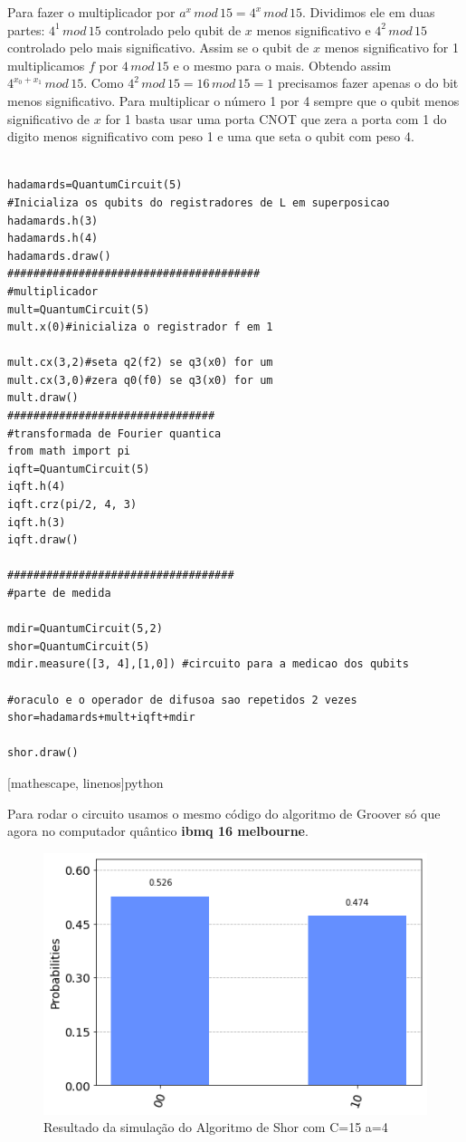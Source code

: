 \documentclass[12pt,a4paper]{article}
\begin{document}
Para fazer o multiplicador por $a^x\, mod\, 15=4^x\, mod\, 15$. Dividimos ele em duas partes: $4^1\, mod\, 15$ controlado pelo qubit de $x$ menos significativo e $4^2\, mod\, 15$ controlado pelo mais significativo. Assim se o qubit de $x$ menos significativo for 1 multiplicamos $f$ por $4\,mod\,15$ e o mesmo para o mais. Obtendo assim $4^{x_0+x_1}\, mod\, 15$. Como $4^2\,mod\,15=16\,mod\,15=1$ precisamos fazer apenas o do bit menos significativo. Para multiplicar o número 1 por 4 sempre que o qubit menos significativo de $x$ for 1 basta usar uma porta CNOT que zera a porta com 1 do digito menos significativo com peso 1 e uma que seta o qubit com peso 4.

\begin{verbatim}

hadamards=QuantumCircuit(5)
#Inicializa os qubits do registradores de L em superposicao
hadamards.h(3)
hadamards.h(4)
hadamards.draw()
#######################################
#multiplicador
mult=QuantumCircuit(5)
mult.x(0)#inicializa o registrador f em 1

mult.cx(3,2)#seta q2(f2) se q3(x0) for um
mult.cx(3,0)#zera q0(f0) se q3(x0) for um
mult.draw()
################################
#transformada de Fourier quantica
from math import pi
iqft=QuantumCircuit(5)
iqft.h(4)
iqft.crz(pi/2, 4, 3)
iqft.h(3)
iqft.draw()

###################################
#parte de medida

mdir=QuantumCircuit(5,2)
shor=QuantumCircuit(5)
mdir.measure([3, 4],[1,0]) #circuito para a medicao dos qubits

#oraculo e o operador de difusoa sao repetidos 2 vezes
shor=hadamards+mult+iqft+mdir

shor.draw()

\end{verbatim}[mathescape, linenos]{python}

Para rodar o circuito usamos o mesmo código do algoritmo de Groover só que agora no computador quântico \textbf{ibmq 16 melbourne}.


\begin{figure}[h!]
    \centering
    \includegraphics[width=1\textwidth]{shora4simu.png}
        \caption{Resultado da simulação do Algoritmo de Shor com C=15 a=4}
    \label{fig:shora4simu}
\end{figure}
\end{document}

